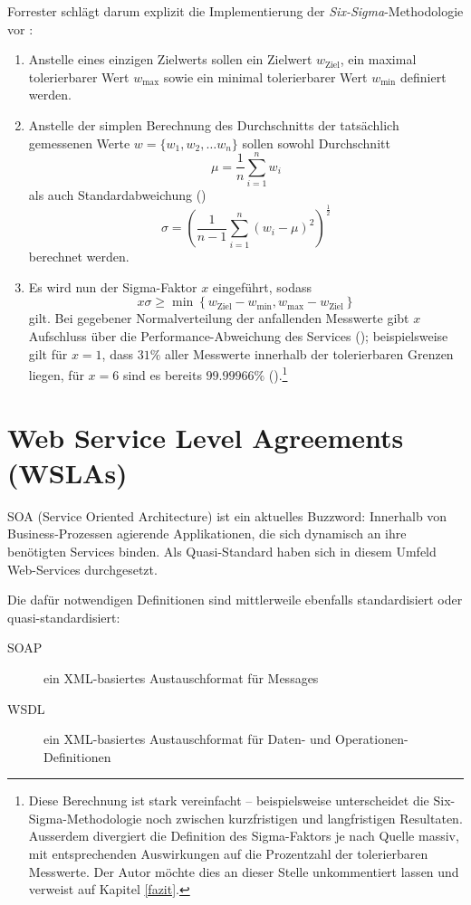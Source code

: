 \documentclass[11pt,listof=totoc]{scrreprt} %
\theoremstyle{definition}
\begin{document}
Forrester schlägt darum explizit die Implementierung der {\em Six-Sigma}-Methodologie vor \cite{forrester:slaBestPractices, wiki:sixsigma}:
\begin{enumerate}
\item Anstelle eines einzigen Zielwerts sollen ein Zielwert $w_\textrm{Ziel}$, ein maximal tolerierbarer Wert $w_\textrm{max}$ sowie ein minimal tolerierbarer Wert $w_\textrm{min}$ definiert werden.
\item Anstelle der simplen Berechnung des Durchschnitts der tatsächlich gemessenen Werte $w = \{w_1, w_2,\dots w_n\}$ sollen sowohl Durchschnitt
\[
\mu = \frac 1 n \sum\limits_{i=1}^{n} w_i
\]
als auch Standardabweichung (\cite{wiki:stdev})
\[
\sigma = \left(\frac 1 {n-1} \sum\limits_{i=1}^{n}(w_i - \mu)^2\right)^{\frac 1 2}
\]
berechnet werden.
\item Es wird nun der Sigma-Faktor $x$ eingeführt, sodass
\[
x\sigma \ge \min\left\{w_\textrm{Ziel}-w_\textrm{min}, w_\textrm{max}-w_\textrm{Ziel} \right\}
\]
gilt. Bei gegebener Normalverteilung der anfallenden Messwerte gibt $x$ Aufschluss über die Performance-Abweichung des Services (\cite{forrester:implementingBsm}); beispielsweise gilt für $x = 1$, dass $31\%$ aller Messwerte innerhalb der tolerierbaren Grenzen liegen, für $x = 6$ sind es bereits $99.99966\%$ (\cite{wiki:sixsigma}).\footnote{Diese Berechnung ist stark vereinfacht -- beispielsweise unterscheidet die Six-Sigma-Methodologie noch zwischen kurzfristigen und langfristigen Resultaten. Ausserdem divergiert die Definition des Sigma-Faktors je nach Quelle massiv, mit entsprechenden Auswirkungen auf die Prozentzahl der tolerierbaren Messwerte. Der Autor möchte dies an dieser Stelle unkommentiert lassen und verweist auf Kapitel \ref{fazit}.}
\end{enumerate}

\section{Web Service Level Agreements (WSLAs)}

SOA (Service Oriented Architecture) ist ein aktuelles Buzzword: Innerhalb von Business-Prozessen agierende Applikationen, die sich dynamisch an ihre benötigten Services binden. Als Quasi-Standard haben sich in diesem Umfeld Web-Services durchgesetzt.

Die dafür notwendigen Definitionen sind mittlerweile ebenfalls standardisiert oder quasi-standardisiert:
\begin{description}
\item[SOAP] ein XML-basiertes Austauschformat für Messages \cite{wiki:soap}
\item[WSDL] ein XML-basiertes Austauschformat für Daten- und Operationen-Definitionen \cite{wiki:wsdl}
\end{description}
\end{document}
